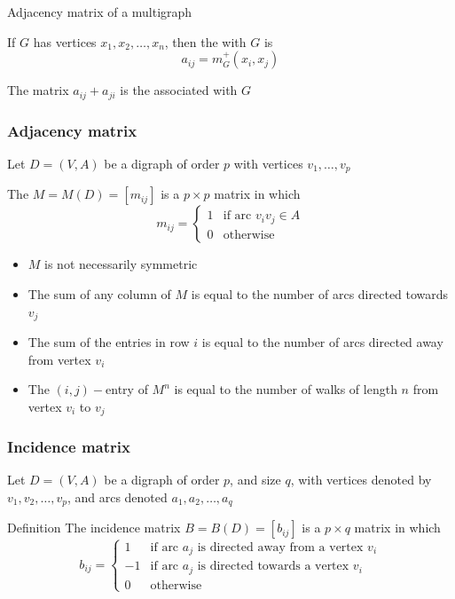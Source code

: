 \documentclass[aspectratio=43]{beamer}
\begin{document}
\begin{frame}{Adjacency matrix of a multigraph}
\begin{definition}
	If $G$ has vertices $x_1,x_2,\ldots,x_n$, then the  with $G$ is 
	\[
	a_{ij}=m_G^+(x_i,x_j)
	\]
\end{definition}
\vfill
\begin{definition}
	The matrix $a_{ij}+a_{ji}$ is the  associated with $G$
\end{definition}
\end{frame}

\begin{frame}\frametitle{Adjacency matrix}
	Let $D=(V,A)$ be a digraph of order $p$ with vertices $v_1,\ldots,v_p$
	\begin{definition}
	The  $M=M(D)=[m_{ij}]$ is a $p\times p$ matrix in which
	$$m_{ij}=\left \{ 
	\begin{array}{cl}
	1 & \textrm{if arc } v_iv_j \in A\\
	0 & \textrm{otherwise}
	\end{array}
	\right .
	$$
	\end{definition}
\end{frame}

\begin{frame}
	\begin{theorem}[{Properties}]
	\begin{itemize}
	\item $M$ is not necessarily symmetric
	\item The sum of any column of $M$ is equal to the number of arcs directed towards $v_j$
	\item The sum of the entries in row $i$ is equal to the number of arcs directed away from vertex $v_i$
	\item The $(i,j)-$entry of $M^n$ is equal to the number of walks of length $n$ from vertex $v_i$ to $v_j$
	\end{itemize}
	\end{theorem}
\end{frame}
	
\begin{frame}\frametitle{Incidence matrix}
	Let $D=(V,A)$ be a digraph of order $p$, and size $q$, with vertices denoted by $v_1, v_2, \dots , v_p$, and arcs denoted $a_1, a_2, \dots , a_q$
	\begin{definition}{Definition}
	The incidence matrix $B=B(D)=[b_{ij}]$ is a $p\times q$ matrix in which
	$$b_{ij}=\left \{ 
	\begin{array}{cl}
	1 & \textrm{if arc } a_j  \textrm{ is directed away from a vertex } v_i\\
	-1 & \textrm{if arc } a_j  \textrm{ is directed towards a vertex } v_i\\
	0 & \textrm{otherwise}
	\end{array}
	\right .
	$$
	\end{definition}
\end{frame}
	
\end{document}
